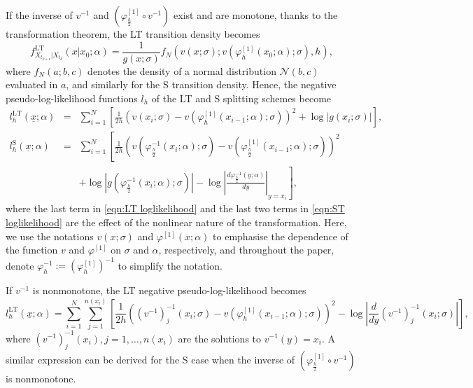 \documentclass[a4paper,12pt]{article}
\numberwithin{equation}{section}
\theoremstyle{plain}
\theoremstyle{definition}
\begin{document}
If the inverse of $v^{-1}$ and $(\varphi_{\frac{h}{2}}^{[1]}\circ v^{-1})$ exist and are monotone, thanks to the transformation theorem, the LT transition density becomes
\begin{equation}\label{fLT}
f^{\textrm{LT}}_{X_{t_{k+1}}|X_{t_{k}}}(x|x_0;
\alpha)=\frac{1}{g(x;\sigma)}f_{N}(v(x;\sigma);v(\varphi_h^{[1]}(x_0;\alpha);\sigma),h),
\end{equation}
where $f_N(a;b,c)$ denotes the density of a normal distribution $\mathcal{N}(b,c)$ evaluated in $a$, and similarly for the S transition density. Hence,  
the negative pseudo-log-likelihood functions $l_h$ of the LT and S splitting schemes become
\begin{eqnarray}
    l_h^{\textrm{LT}}(\underline{x};\alpha)&=&\sum_{i=1}^{N}\left[\frac{1}{2h}\left(v(x_{i};\sigma)-v(\varphi^{[1]}_h(x_{{i-1}};\alpha);\sigma)\right)^2+\log |g(x_{i};\sigma)|\right],\label{eqn:LT loglikelihood}\\ 
\nonumber l_h^{\textrm{S}}(\underline{x};\alpha)&=&\sum_{i=1}^N \left[\frac{1}{2h}\left(v(\varphi^{-1}_{\frac{h}{2}}(x_{i};\alpha);\sigma)-v(\varphi^{[1]}_{\frac{h}{2}}(x_{i-1};\alpha);\sigma)\right)^2\right.\\
&&\label{eqn:ST loglikelihood}\left.+\log |g(\varphi^{-1}_{\frac{h}{2}}(x_{i};\alpha);\sigma)|-\log\left|\frac{d\varphi^{-1}_{\frac{h}{2}}(y;\alpha)}{dy}\right|_{y=x_{i}}\right],
\end{eqnarray}
where the last term in \eqref{eqn:LT loglikelihood} and the last two terms in \eqref{eqn:ST loglikelihood} are the effect of the nonlinear nature of the transformation.
Here, we use the notations $v(x;\sigma)$ and $\varphi^{[1]}(x;\alpha)$ to emphasise the dependence of the function $v$ and $\varphi^{[1]}$ on $\sigma$ and $\alpha$, respectively, and throughout the paper, denote $\varphi^{-1}_h:=(\varphi^{[1]}_h)^{-1}$ to simplify the notation.

If $v^{-1}$ is nonmonotone, the LT negative pseudo-log-likelihood becomes 
\begin{equation}\label{logLT2}
    l_h^{\textrm{LT}}(\underline{x};\alpha)=\sum_{i=1}^{N}\sum_{j=1}^{n(x_i)}\left[
    \frac{1}{2h}\left((v^{-1})_j^{-1}(x_{i};\sigma)-v(\varphi^{[1]}_h(x_{{i-1}};\alpha);\sigma)\right)^2-\log \left|\frac{d}{dy}(v^{-1})_j^{-1}(x_{i};\sigma)\right|\right],
    \end{equation}
    where $(v^{-1})^{-1}_j(x_i), j=1,\ldots, n(x_i)$ are the solutions to $v^{-1}(y)=x_i$. A similar expression can be derived for the S case when the inverse of $(\varphi_{\frac{h}{2}}^{[1]}\circ v^{-1})$ is nonmonotone.
\end{document}
